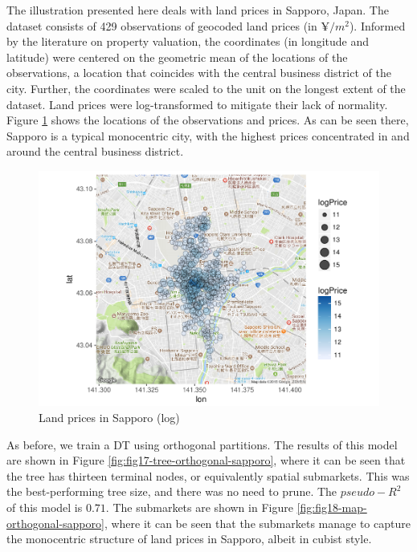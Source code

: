 \documentclass[]{elsarticle} %
\makeatletter
\def\maxwidth{\ifdim\Gin@nat@width>\linewidth\linewidth
\else\Gin@nat@width\fi}
\let\Oldincludegraphics\includegraphics
\renewcommand{\includegraphics}[1]{\Oldincludegraphics[width=\maxwidth]{#1}}
\makeatother
\begin{document}
The illustration presented here deals with land prices in Sapporo,
Japan. The dataset consists of 429 observations of geocoded land prices
(in \(\yen/m^2\)). Informed by the literature on property valuation, the
coordinates (in longitude and latitude) were centered on the geometric
mean of the locations of the observations, a location that coincides
with the central business district of the city. Further, the coordinates
were scaled to the unit on the longest extent of the dataset. Land
prices were log-transformed to mitigate their lack of normality. Figure
\ref{fig:fig16-map-sapporo} shows the locations of the observations and
prices. As can be seen there, Sapporo is a typical monocentric city,
with the highest prices concentrated in and around the central business
district.

\begin{figure}[htbp]
\centering
\includegraphics{Trees_with_Base_Functions_files/figure-latex/fig16-map-sapporo-1.pdf}
\caption{\label{fig:fig16-map-sapporo}Land prices in Sapporo (log)}
\end{figure}

As before, we train a DT using orthogonal partitions. The results of
this model are shown in Figure \ref{fig:fig17-tree-orthogonal-sapporo},
where it can be seen that the tree has thirteen terminal nodes, or
equivalently spatial submarkets. This was the best-performing tree size,
and there was no need to prune. The \(pseudo-R^2\) of this model is
\(0.71\). The submarkets are shown in Figure
\ref{fig:fig18-map-orthogonal-sapporo}, where it can be seen that the
submarkets manage to capture the monocentric structure of land prices in
Sapporo, albeit in cubist style.
\end{document}
